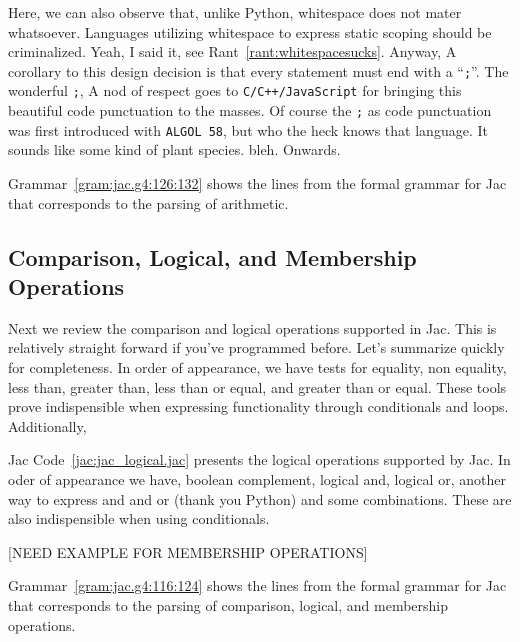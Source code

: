 
Here, we can also observe that, unlike Python, whitespace does not mater whatsoever. Languages utilizing whitespace to express static scoping should be criminalized. Yeah, I said it, see Rant~\ref{rant:whitespacesucks}. Anyway, A corollary to this design decision is that every statement must end with a ``\texttt{;}''. The wonderful \texttt{;}, A nod of respect goes to \texttt{C/C++/JavaScript} for bringing this beautiful code punctuation to the masses. Of course the \texttt{;} as code punctuation was first introduced with \texttt{ALGOL 58}, but who the heck knows that language. It sounds like some kind of plant species. \Gls{bleh}. Onwards.

\begin{nerd}
    Grammar~\ref{gram:jac.g4:126:132} shows  the lines from the formal grammar for Jac that corresponds to the parsing of arithmetic.
\end{nerd}

\subsection{Comparison, Logical, and Membership Operations}
Next we review the comparison and logical operations supported in Jac. This is relatively straight forward if you've programmed before. Let's summarize quickly for completeness.
In order of appearance, we have tests for equality, non equality, less than, greater than, less than or equal, and greater than or equal. These tools prove indispensible when expressing functionality through conditionals and loops. Additionally,

Jac Code~\ref{jac:jac_logical.jac} presents the logical operations supported by Jac. In oder of appearance we have, boolean complement, logical and, logical or, another way to express and and or (thank you Python) and some combinations. These are also indispensible when using conditionals.

[NEED EXAMPLE FOR MEMBERSHIP OPERATIONS]

\begin{nerd}
    Grammar~\ref{gram:jac.g4:116:124} shows the lines from the formal grammar for Jac that corresponds to the parsing of comparison, logical, and membership operations.
\end{nerd}

